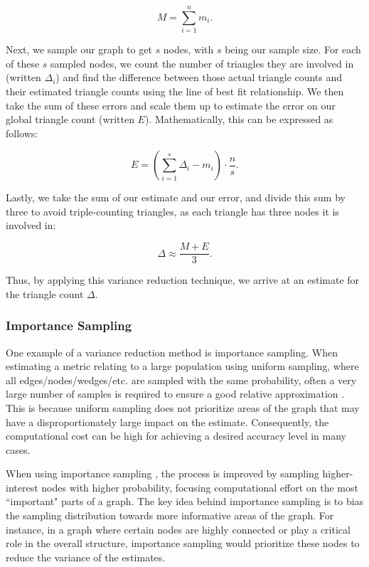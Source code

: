 \documentclass[11pt]{article}
\begin{document}
\[
M = \sum_{i = 1}^{n} m_i.
\]

Next, we sample our graph to get $s$ nodes, with $s$ being our sample size. For each of these $s$ sampled nodes, we count the number of triangles they are involved in (written $\Delta_i$) and find the difference between those actual triangle counts and their estimated triangle counts using the line of best fit relationship. We then take the sum of these errors and scale them up to estimate the error on our global triangle count (written $E$). Mathematically, this can be expressed as follows:

\[
E = \left( \sum_{i = 1}^{s} \Delta_i - m_i \right) \cdot \frac{n}{s}.
\]

Lastly, we take the sum of our estimate and our error, and divide this sum by three to avoid triple-counting triangles, as each triangle has three nodes it is involved in:

\[
\Delta \approx \frac{M + E}{3}.
\]

Thus, by applying this variance reduction technique, we arrive at an estimate for the triangle count $\Delta$.

\subsubsection{Importance Sampling}
\label{sec:importance-sampling-background}

One example of a variance reduction method is importance sampling.
When estimating a metric relating to a large population using uniform sampling, where all edges/nodes/wedges/etc. are sampled with the same probability, often a very large number of samples is required to ensure a good relative approximation \cite{lovasz_large_2012}.
This is because uniform sampling does not prioritize areas of the graph that may have a disproportionately large impact on the estimate.
Consequently, the computational cost can be high for achieving a desired accuracy level in many cases.

When using importance sampling \cite{motwani_randomized_1995}, the process is improved by sampling higher-interest nodes with higher probability, focusing computational effort on the most ``important" parts of a graph.
The key idea behind importance sampling is to bias the sampling distribution towards more informative areas of the graph.
For instance, in a graph where certain nodes are highly connected or play a critical role in the overall structure, importance sampling would prioritize these nodes to reduce the variance of the estimates.
\end{document}
